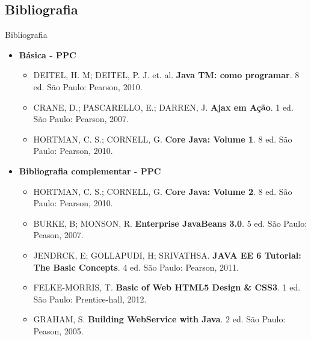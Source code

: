 \documentclass{beamer}
\begin{document}
\subsection{Bibliografia}

\begin{frame}{Bibliografia}
    \begin{itemize}
        \item \textbf{Básica - PPC}
        \begin{itemize}
            \justifying
            \scriptsize
            \item DEITEL, H. M; DEITEL, P. J. et. al. \textbf{Java TM: como programar}. 8 ed. São Paulo: Pearson, 2010.
            \item CRANE, D.; PASCARELLO, E.; DARREN, J. \textbf{Ajax em Ação}. 1 ed. São Paulo: Pearson, 2007.
            \item HORTMAN, C. S.; CORNELL, G. \textbf{Core Java: Volume 1}. 8 ed. São Paulo: Pearson, 2010.
        \end{itemize}
        \normalsize
        \item \textbf{Bibliografia complementar - PPC}
        \begin{itemize}
            \justifying
            \scriptsize
            \item HORTMAN, C. S.; CORNELL, G. \textbf{Core Java: Volume 2}. 8 ed. São Paulo: Pearson, 2010.
            \item BURKE, B; MONSON, R. \textbf{Enterprise JavaBeans 3.0}. 5 ed. São Paulo: Peason, 2007.
            \item JENDRCK, E; GOLLAPUDI, H; SRIVATHSA. \textbf{JAVA EE 6 Tutorial: The Basic Concepts}. 4 ed. São Paulo: Pearson, 2011.
            \item FELKE-MORRIS, T. \textbf{Basic of Web HTML5 Design \& CSS3}. 1 ed. São Paulo: Prentice-hall, 2012.
            \item GRAHAM, S. \textbf{Building WebService with Java}. 2 ed. São Paulo: Peason, 2005.
        \end{itemize}
    \end{itemize}
\end{frame}
\end{document}
